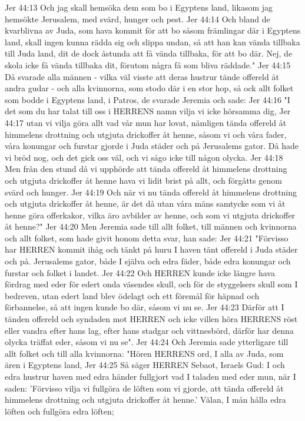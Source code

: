 Jer 44:13  Och jag skall hemsöka dem som bo i Egyptens land, likasom jag hemsökte Jerusalem, med svärd, hunger och pest.
Jer 44:14  Och bland de kvarblivna av Juda, som hava kommit för att bo såsom främlingar där i Egyptens land, skall ingen kunna rädda sig och slippa undan, så att han kan vända tillbaka till Juda land, dit de dock åstunda att få vända tillbaka, för att bo där. Nej, de skola icke få vända tillbaka dit, förutom några få som bliva räddade."
Jer 44:15  Då svarade alla männen - vilka väl visste att deras hustrur tände offereld åt andra gudar - och alla kvinnorna, som stodo där i en stor hop, så ock allt folket som bodde i Egyptens land, i Patros, de svarade Jeremia och sade:
Jer 44:16  "I det som du har talat till oss i HERRENS namn vilja vi icke hörsamma dig,
Jer 44:17  utan vi vilja göra allt vad vår mun har lovat, nämligen tända offereld åt himmelens drottning och utgjuta drickoffer åt henne, såsom vi och våra fader, våra konungar och furstar gjorde i Juda städer och på Jerusalems gator. Då hade vi bröd nog, och det gick oss väl, och vi sågo icke till någon olycka.
Jer 44:18  Men från den stund då vi upphörde att tända offereld åt himmelens drottning och utgjuta drickoffer åt henne hava vi lidit brist på allt, och förgåtts genom svärd och hunger.
Jer 44:19  Och när vi nu tända offereld åt himmelens drottning och utgjuta drickoffer åt henne, är det då utan våra mäns samtycke som vi åt henne göra offerkakor, vilka äro avbilder av henne, och som vi utgjuta drickoffer åt henne?"
Jer 44:20  Men Jeremia sade till allt folket, till männen och kvinnorna och allt folket, som hade givit honom detta svar, han sade:
Jer 44:21  "Förvisso har HERREN kommit ihåg och tänkt på huru I haven tänt offereld i Juda städer och på. Jerusalems gator, både I själva och edra fäder, både edra konungar och furstar och folket i landet.
Jer 44:22  Och HERREN kunde icke längre hava fördrag med eder för edert onda väsendes skull, och för de styggelsers skull som I bedreven, utan edert land blev ödelagt och ett föremål för häpnad och förbannelse, så att ingen kunde bo där, såsom vi nu se.
Jer 44:23  Därför att I tänden offereld och syndaden mot HERREN och icke villen höra HERRENS röst eller vandra efter hans lag, efter hans stadgar och vittnesbörd, därför har denna olycka träffat eder, såsom vi nu se".
Jer 44:24  Och Jeremia sade ytterligare till allt folket och till alla kvinnorna: "Hören HERRENS ord, I alla av Juda, som ären i Egyptens land,
Jer 44:25  Så säger HERREN Sebaot, Israels Gud: I och edra hustrur haven med edra händer fullgjort vad I taladen med eder mun, när I saden: 'Förvisso vilja vi fullgöra de löften som vi gjorde, att tända offereld åt himmelens drottning och utgjuta drickoffer åt henne.' Välan, I mån hålla edra löften och fullgöra edra löften;
